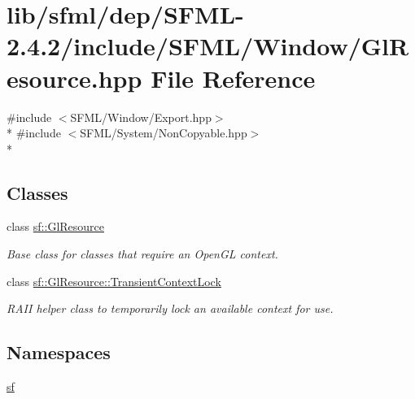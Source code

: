 \hypertarget{sfml_2dep_2_s_f_m_l-2_84_82_2include_2_s_f_m_l_2_window_2_gl_resource_8hpp}{\section{lib/sfml/dep/\-S\-F\-M\-L-\/2.4.2/include/\-S\-F\-M\-L/\-Window/\-Gl\-Resource.hpp File Reference}
\label{sfml_2dep_2_s_f_m_l-2_84_82_2include_2_s_f_m_l_2_window_2_gl_resource_8hpp}
}
{\ttfamily \#include $<$S\-F\-M\-L/\-Window/\-Export.\-hpp$>$}\\*
{\ttfamily \#include $<$S\-F\-M\-L/\-System/\-Non\-Copyable.\-hpp$>$}\\*
\subsection*{Classes}
\begin{DoxyCompactItemize}
\item 
class \hyperlink{classsf_1_1_gl_resource}{sf\-::\-Gl\-Resource}
\begin{DoxyCompactList}\small\item\em Base class for classes that require an Open\-G\-L context. \end{DoxyCompactList}\item 
class \hyperlink{classsf_1_1_gl_resource_1_1_transient_context_lock}{sf\-::\-Gl\-Resource\-::\-Transient\-Context\-Lock}
\begin{DoxyCompactList}\small\item\em R\-A\-I\-I helper class to temporarily lock an available context for use. \end{DoxyCompactList}\end{DoxyCompactItemize}
\subsection*{Namespaces}
\begin{DoxyCompactItemize}
\item 
\hyperlink{namespacesf}{sf}
\end{DoxyCompactItemize}
